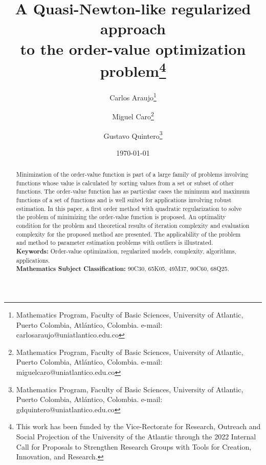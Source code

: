 \documentclass[11pt]{article}
\begin{document}
\title{A Quasi-Newton-like regularized approach\\ to the order-value optimization problem\thanks{This work has been funded by the Vice-Rectorate for Research, Outreach and Social Projection of the University of the Atlantic through the 2022 Internal Call for Proposals to Strengthen Research Groups with Tools for Creation, Innovation, and Research.}}

\author{
    Carlos Araujo\thanks{Mathematics Program, Faculty of Basic Sciences, University of Atlantic, Puerto Colombia, Atlántico, Colombia. e-mail: carlosaraujo@uniatlantico.edu.co}
    \and
    Miguel Caro\thanks{Mathematics Program, Faculty of Basic Sciences, University of Atlantic, Puerto Colombia, Atlántico, Colombia. e-mail: miguelcaro@uniatlantico.edu.co}
    \and
    Gustavo Quintero\thanks{Mathematics Program, Faculty of Basic Sciences, University of Atlantic, Puerto Colombia, Atlántico, Colombia. e-mail: gdquintero@uniatlantico.edu.co}
}

\date{\today}
\maketitle

\begin{abstract}
Minimization of the order-value function is part of a large family of problems involving functions whose value is calculated by sorting values from a set or subset of other functions. The order-value function has as particular cases the minimum and maximum functions of a set of functions and is well suited for applications involving robust estimation. In this paper, a first order method with quadratic regularization to solve the problem of minimizing the order-value function is proposed. An optimality condition for the problem and theoretical results of iteration complexity and evaluation complexity for the proposed method are presented. The applicability of the problem and method to parameter estimation problems with outliers is illustrated.\\

\noindent
\textbf{Keywords:} Order-value optimization, regularized models, complexity, algorithms, applications.\\

\noindent
\textbf{Mathematics Subject Classification:} 90C30, 65K05, 49M37, 90C60, 68Q25.\\
\end{abstract}
\end{document}
